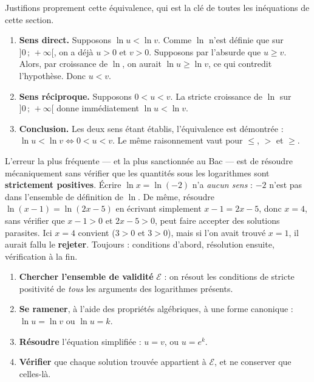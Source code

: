 \documentclass[11pt]{article}
\newcommand{\cle}[1]{{\popxbold\color{popdark}#1}}
\newcounter{popsec}
\newcounter{popsub}
\newcommand{\courssub}[1]{%
  \stepcounter{popsub}%
  \par\vspace{9pt}\noindent{\popxbold\fontsize{11.5}{13}\selectfont\color{popink}{\color{poporange}\thepopsec.\thepopsub}\hspace{6pt}#1}\par\nopagebreak\vspace{4pt}
}
\begin{document}
\begin{experience}
Justifions proprement cette équivalence, qui est la clé de toutes les inéquations de cette section.
\begin{enumerate}
\item \textbf{Sens direct.} Supposons $\ln u < \ln v$. Comme $\ln$ n'est définie que sur $]0\,;\,+\infty[$, on a déjà $u > 0$ et $v > 0$. Supposons par l'absurde que $u \geq v$. Alors, par croissance de $\ln$, on aurait $\ln u \geq \ln v$, ce qui contredit l'hypothèse. Donc $u < v$.
\item \textbf{Sens réciproque.} Supposons $0 < u < v$. La stricte croissance de $\ln$ sur $]0\,;\,+\infty[$ donne immédiatement $\ln u < \ln v$.
\item \textbf{Conclusion.} Les deux sens étant établis, l'équivalence est démontrée : $\ln u < \ln v \iff 0 < u < v$. Le même raisonnement vaut pour $\leq$, $>$ et $\geq$.
\end{enumerate}
\end{experience}

\begin{attention}
L'erreur la plus fréquente — et la plus sanctionnée au Bac — est de résoudre mécaniquement sans vérifier que les quantités sous les logarithmes sont \textbf{strictement positives}. Écrire $\ln x = \ln(-2)$ n'a \emph{aucun sens} : $-2$ n'est pas dans l'ensemble de définition de $\ln$. De même, résoudre $\ln(x-1) = \ln(2x-5)$ en écrivant simplement $x - 1 = 2x - 5$, donc $x = 4$, sans vérifier que $x - 1 > 0$ et $2x - 5 > 0$, peut faire accepter des \cle{solutions parasites}. Ici $x = 4$ convient ($3 > 0$ et $3 > 0$), mais si l'on avait trouvé $x = 1$, il aurait fallu le \textbf{rejeter}. Toujours : conditions d'abord, résolution ensuite, vérification à la fin.
\end{attention}

\courssub{Équations du type $\ln u(x) = \ln v(x)$ ou $\ln u(x) = k$}

\begin{methode}
\begin{enumerate}
\item \textbf{Chercher l'ensemble de validité} $\mathcal{E}$ : on résout les conditions de stricte positivité de \emph{tous} les arguments des logarithmes présents.
\item \textbf{Se ramener}, à l'aide des propriétés algébriques, à une forme canonique : $\ln u = \ln v$ ou $\ln u = k$.
\item \textbf{Résoudre} l'équation simplifiée : $u = v$, ou $u = e^{k}$.
\item \textbf{Vérifier} que chaque solution trouvée appartient à $\mathcal{E}$, et ne conserver que celles-là.
\end{enumerate}
\end{methode}
\end{document}
